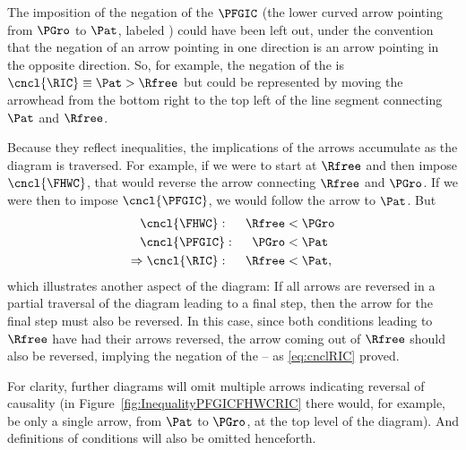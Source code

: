 \documentclass[\econtexRoot/BufferStockTheory]{subfiles}
\begin{document}
The imposition of the negation of the $\PFGIC$ (the lower curved arrow pointing from $\PGro$ to {$\Pat$}, labeled \cncl{\PFGIC}) could have been left out, under the convention that the negation of an arrow pointing in one direction is an arrow pointing in the opposite direction.  So, for example, the negation of the {\RIC} is $\cncl{\RIC} \equiv \Pat > \Rfree$ but could be represented by moving the arrowhead from the bottom right to the top left of the line segment connecting {$\Pat$} and $\Rfree$.

Because they reflect inequalities, the implications of the arrows accumulate as the diagram is traversed.  For example, if we were to start at $\Rfree$ and then impose $\cncl{\FHWC}$, that would reverse the arrow connecting $\Rfree$ and $\PGro$.  If we were then to impose $\cncl{\PFGIC}$, we would follow the arrow to {$\Pat$}.  But  
\begin{align}
  \cncl{\FHWC}:~~~~  \Rfree & < \PGro \notag  
  \\ \cncl{\PFGIC}:~~~~ \PGro & < \Pat %
                                \label{eq:cnclRIC}
  \\ \Rightarrow \cncl{\RIC}:~~~~\Rfree & < \Pat \notag,
\end{align}
which illustrates another aspect of the diagram: If all arrows are reversed in a partial traversal of the diagram leading to a final step, then the arrow for the final step must also be reversed.  In this case, since both conditions leading to $\Rfree$ have had their arrows reversed, the arrow coming out of $\Rfree$ should also be reversed, implying the negation of the {\RIC} -- as \eqref{eq:cnclRIC} proved.

For clarity, further diagrams will omit multiple arrows indicating reversal of causality (in Figure~\ref{fig:InequalityPFGICFHWCRIC} there would, for example, be only a single arrow, from {$\Pat$} to $\PGro$, at the top level of the diagram).  And definitions of conditions will also be omitted henceforth.
\end{document}
